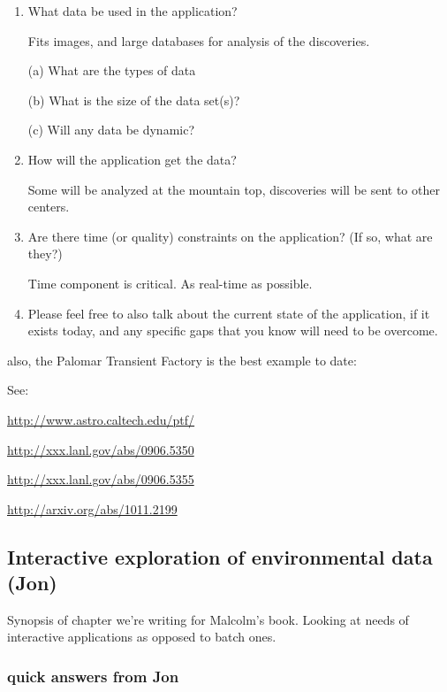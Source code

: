 \documentclass[preprint,12pt]{article}
\begin{document}
\begin{enumerate}
(a) What will be distributed?  data, compute, both?

both

\item What data be used in the application?

Fits images, and large databases for analysis of the discoveries.

 (a) What are the types of data

 (b) What is the size of the data set(s)?

 (c) Will any data be dynamic?

\item How will the application get the data?

Some will be analyzed at the mountain top, discoveries will be sent to other centers.

\item Are there time (or quality) constraints on the application?  (If so, what are they?)

Time component is critical. As real-time as possible.

\item Please feel free to also talk about the current state of the application, if it exists today, and any specific gaps that you know will need to be overcome.

\end{enumerate}


also, the Palomar Transient Factory is the best example to date:

See:

\url{http://www.astro.caltech.edu/ptf/}

\url{http://xxx.lanl.gov/abs/0906.5350}

\url{http://xxx.lanl.gov/abs/0906.5355}

\url{http://arxiv.org/abs/1011.2199}




\subsection{Interactive exploration of environmental data (Jon) \label{envJon}}
Synopsis of chapter we're writing for Malcolm's book.  Looking at needs of interactive applications as opposed to batch ones.

\subsubsection{quick answers from Jon}
\end{document}
